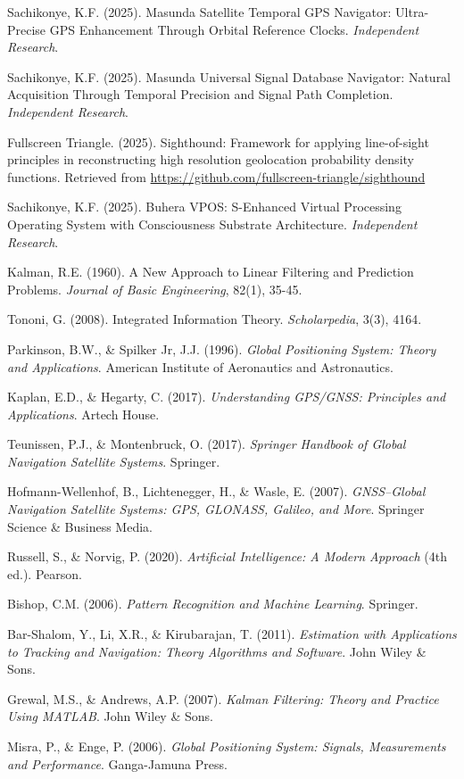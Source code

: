 \documentclass[12pt,a4paper]{article}
\begin{document}

\begin{thebibliography}{99}

Sachikonye, K.F. (2025). Masunda Satellite Temporal GPS Navigator: Ultra-Precise GPS Enhancement Through Orbital Reference Clocks. \textit{Independent Research}.

Sachikonye, K.F. (2025). Masunda Universal Signal Database Navigator: Natural Acquisition Through Temporal Precision and Signal Path Completion. \textit{Independent Research}.

Fullscreen Triangle. (2025). Sighthound: Framework for applying line-of-sight principles in reconstructing high resolution geolocation probability density functions. Retrieved from \url{https://github.com/fullscreen-triangle/sighthound}

Sachikonye, K.F. (2025). Buhera VPOS: S-Enhanced Virtual Processing Operating System with Consciousness Substrate Architecture. \textit{Independent Research}.

Kalman, R.E. (1960). A New Approach to Linear Filtering and Prediction Problems. \textit{Journal of Basic Engineering}, 82(1), 35-45.

Tononi, G. (2008). Integrated Information Theory. \textit{Scholarpedia}, 3(3), 4164.

Parkinson, B.W., \& Spilker Jr, J.J. (1996). \textit{Global Positioning System: Theory and Applications}. American Institute of Aeronautics and Astronautics.

Kaplan, E.D., \& Hegarty, C. (2017). \textit{Understanding GPS/GNSS: Principles and Applications}. Artech House.

Teunissen, P.J., \& Montenbruck, O. (2017). \textit{Springer Handbook of Global Navigation Satellite Systems}. Springer.

Hofmann-Wellenhof, B., Lichtenegger, H., \& Wasle, E. (2007). \textit{GNSS–Global Navigation Satellite Systems: GPS, GLONASS, Galileo, and More}. Springer Science \& Business Media.

Russell, S., \& Norvig, P. (2020). \textit{Artificial Intelligence: A Modern Approach} (4th ed.). Pearson.

Bishop, C.M. (2006). \textit{Pattern Recognition and Machine Learning}. Springer.

Bar-Shalom, Y., Li, X.R., \& Kirubarajan, T. (2011). \textit{Estimation with Applications to Tracking and Navigation: Theory Algorithms and Software}. John Wiley \& Sons.

Grewal, M.S., \& Andrews, A.P. (2007). \textit{Kalman Filtering: Theory and Practice Using MATLAB}. John Wiley \& Sons.

Misra, P., \& Enge, P. (2006). \textit{Global Positioning System: Signals, Measurements and Performance}. Ganga-Jamuna Press.

\end{thebibliography}
\end{document}
